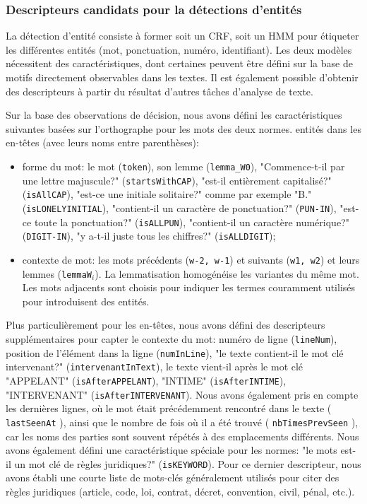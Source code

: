\subsubsection{Descripteurs candidats pour la détections d'entités}

La détection d'entité consiste à former soit un CRF, soit un HMM pour étiqueter les différentes entités (mot, ponctuation, numéro, identifiant). Les deux modèles nécessitent des caractéristiques, dont certaines peuvent être défini sur la base de motifs directement observables dans les textes. Il est également possible d'obtenir des descripteurs à partir du résultat d'autres tâches d'analyse de texte.

Sur la base des observations de décision, nous avons défini les caractéristiques suivantes basées sur l'orthographe pour les mots des deux normes.
entités dans les en-têtes (avec leurs noms entre parenthèses):
\begin{itemize}
	\item forme du mot: le mot (\verb|token|), son lemme (\verb|lemma_W0|), "Commence-t-il par une lettre majuscule?" (\verb|startsWithCAP|), "est-il entièrement capitalisé?" (\verb|isAllCAP|), "est-ce une initiale solitaire?" comme par exemple "B." (\verb|isLONELYINITIAL|), "contient-il un caractère de ponctuation?" (\verb|PUN-IN|), "est-ce toute la ponctuation?" (\verb|isALLPUN|), "contient-il un caractère numérique?" (\verb|DIGIT-IN|), "y a-t-il juste tous les chiffres?" (\verb|isALLDIGIT|);
	\item contexte de mot: les mots précédents (\verb|w-2, w-1|) et suivants (\verb|w1, w2|) et leurs lemmes (\verb|lemmaW|$_i$). La lemmatisation homogénéise les variantes du même mot. Les mots adjacents sont choisis pour indiquer les termes couramment utilisés pour introduisent des entités.
\end{itemize}

Plus particulièrement pour les en-têtes, nous avons défini des descripteurs supplémentaires pour capter le contexte du mot: numéro de ligne (\verb|lineNum|), position de l'élément dans la ligne (\verb|numInLine|), "le texte contient-il le mot clé intervenant?" (\verb|intervenantInText|), le texte vient-il après le mot clé "APPELANT" (\verb|isAfterAPPELANT|), "INTIME" (\verb|isAfterINTIME|), "INTERVENANT" (\verb|isAfterINTERVENANT|). Nous avons également pris en compte les dernières lignes, où le mot était précédemment rencontré dans le texte ( \verb|lastSeenAt| ), ainsi que le nombre de fois où il a été trouvé ( \verb|nbTimesPrevSeen| ), car les noms des parties sont souvent répétés à des emplacements différents. Nous avons également défini une caractéristique spéciale pour les normes: "le mots est-il un mot clé de règles juridiques?" (\verb|isKEYWORD|). Pour ce dernier descripteur, nous avons établi une courte liste de mots-clés généralement utilisés pour citer des règles juridiques (article, code, loi, contrat, décret, convention, civil, pénal, etc.).


